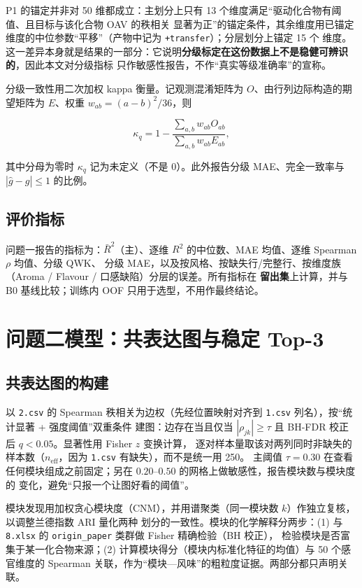 \documentclass[
  a4paper,12pt]{article}
\begin{document}
P1 的锚定并非对 50 维都成立：主划分上只有 13
个维度满足``驱动化合物有阈值、且目标与该化合物 OAV 的秩相关
显著为正''的锚定条件，其余维度用已锚定维度的中位参数``平移''（产物中记为
\texttt{+transfer}）；分层划分上锚定 15 个
维度。这一差异本身就是结果的一部分：它说明\textbf{分级标定在这份数据上不是稳健可辨识的}，因此本文对分级指标
只作敏感性报告，不作``真实等级准确率''的宣称。

分级一致性用二次加权 kappa 衡量。记观测混淆矩阵为
\(O\)、由行列边际构造的期望矩阵为 \(E\)、权重 \(w_{ab}=(a-b)^2/36\)，则

\[
\kappa_q=1-\frac{\sum_{a,b}w_{ab}O_{ab}}{\sum_{a,b}w_{ab}E_{ab}},
\]

其中分母为零时 \(\kappa_q\) 记为未定义（不是 0）。此外报告分级
MAE、完全一致率与 \(|\hat g-g|\le1\) 的比例。

\subsection{评价指标}\label{ux8bc4ux4ef7ux6307ux6807}

问题一报告的指标为：\(\bar R^2\)（主）、逐维 \(R^2\) 的中位数、MAE
均值、逐维 Spearman \(\rho\) 均值、分级 QWK、 分级
MAE，以及按风格、按缺失行/完整行、按维度族（Aroma / Flavour /
口感缺陷）分层的误差。所有指标在 \textbf{留出集}上计算，并与 B0
基线比较；训练内 OOF 只用于选型，不用作最终结论。

\section{问题二模型：共表达图与稳定
Top-3}\label{ux95eeux9898ux4e8cux6a21ux578bux5171ux8868ux8fbeux56feux4e0eux7a33ux5b9a-top-3}

\subsection{共表达图的构建}\label{ux5171ux8868ux8fbeux56feux7684ux6784ux5efa}

以 \texttt{2.csv} 的 Spearman 秩相关为边权（先经位置映射对齐到
\texttt{1.csv} 列名），按``统计显著 + 强度阈值''双重条件
建图：边存在当且仅当 \(|\rho_{jk}|\ge\tau\) 且 BH-FDR 校正后
\(q<0.05\)。显著性用 Fisher \(z\) 变换计算，
逐对样本量取该对两列同时非缺失的样本数（\(n_{\text{eff}}\)，因为
\texttt{1.csv} 有缺失），而不是统一用 250。 主阈值 \(\tau=0.30\)
在查看任何模块组成之前固定；另在 \(0.20\)--\(0.50\)
的网格上做敏感性，报告模块数与模块度的
变化，避免``只报一个让图好看的阈值''。

模块发现用加权贪心模块度（CNM），并用谱聚类（同一模块数
\(k\)）作独立复核，以调整兰德指数 ARI 量化两种
划分的一致性。模块的化学解释分两步：(1) 与 \texttt{8.xlsx} 的
\texttt{origin\_paper} 类群做 Fisher 精确检验（BH 校正），
检验模块是否富集于某一化合物来源；(2)
计算模块得分（模块内标准化特征的均值）与 50 个感官维度的 Spearman
关联，作为``模块---风味''的粗粒度证据。两部分都只声明关联。
\end{document}
